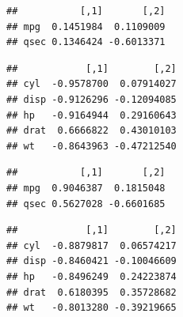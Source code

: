 \documentclass[
]{book}
\newenvironment{Shaded}{\begin{snugshade}}{\end{snugshade}}
\newcommand{\FunctionTok}[1]{\textcolor[rgb]{0.13,0.29,0.53}{\textbf{#1}}}
\newcommand{\NormalTok}[1]{#1}
\newcommand{\SpecialCharTok}[1]{\textcolor[rgb]{0.81,0.36,0.00}{\textbf{#1}}}
\theoremstyle{definition}
\theoremstyle{definition}
\theoremstyle{definition}
\theoremstyle{definition}
\theoremstyle{remark}
\begin{document}
\begin{verbatim}
##           [,1]       [,2]
## mpg  0.1451984  0.1109009
## qsec 0.1346424 -0.6013371
\end{verbatim}

\begin{Shaded}
\end{Shaded}

\begin{verbatim}
##            [,1]        [,2]
## cyl  -0.9578700  0.07914027
## disp -0.9126296 -0.12094085
## hp   -0.9164944  0.29160643
## drat  0.6666822  0.43010103
## wt   -0.8643963 -0.47212540
\end{verbatim}

\begin{Shaded}
\end{Shaded}

\begin{verbatim}
##           [,1]       [,2]
## mpg  0.9046387  0.1815048
## qsec 0.5627028 -0.6601685
\end{verbatim}

\begin{Shaded}
\end{Shaded}

\begin{verbatim}
##            [,1]        [,2]
## cyl  -0.8879817  0.06574217
## disp -0.8460421 -0.10046609
## hp   -0.8496249  0.24223874
## drat  0.6180395  0.35728682
## wt   -0.8013280 -0.39219665
\end{verbatim}

\begin{Shaded}
\end{Shaded}
\end{document}
